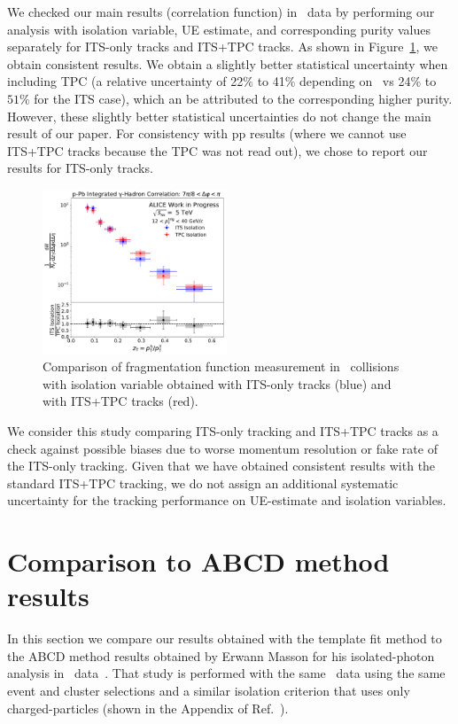 We checked our main results (correlation function) in \pPb~data by performing our analysis with isolation variable, UE estimate, and corresponding purity values separately for ITS-only tracks and ITS+TPC tracks. As shown in Figure~\ref{fig:ComparisonTPCITSiso_frag}, we obtain consistent results. We obtain a slightly better statistical uncertainty when including TPC (a relative uncertainty of 22$\%$ to 41$\%$ depending on \zt~vs 24$\%$ to $51\%$ for the ITS case), which an be attributed to the corresponding higher purity. However, these slightly better statistical uncertainties do not change the main result of our paper. For consistency with pp results (where we cannot use ITS+TPC tracks because the TPC was not read out), we chose to report our results for ITS-only tracks. 

\begin{figure}
	\center
	\includegraphics[width=0.49\textwidth]{Appendices/ISO_Compare_Final_FFunction_and_Ratio}
	\caption{Comparison of fragmentation function measurement in \pPb~collisions with isolation variable obtained with ITS-only tracks (blue) and with ITS+TPC tracks (red).}
	\label{fig:ComparisonTPCITSiso_frag}
\end{figure}

We consider this study comparing ITS-only tracking and ITS+TPC tracks as a check against possible biases due to worse momentum resolution or fake rate of the ITS-only tracking. Given that we have obtained consistent results with the standard ITS+TPC tracking, we do not assign an additional systematic uncertainty for the tracking performance on UE-estimate and isolation variables. 

\section{Comparison to ABCD method results}
\label{sec:comparisontoABCD}
In this section we compare our results obtained with the template fit method to the ABCD method results obtained by Erwann Masson for his isolated-photon analysis in \pPb~data~\cite{Erwann}. That study is performed with the same \pPb~data using the same event and cluster selections and a similar isolation criterion that uses only charged-particles (shown in the Appendix of Ref.~\cite{Erwann}).

